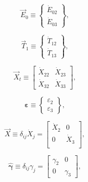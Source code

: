 \begin{equation} \label{eq:E_vec_def}
	\vec{E}_{0} 
	\equiv
	\begin{Bmatrix}
		\dot{E}_{02} \\
		\dot{E}_{03}
	\end{Bmatrix},
\end{equation} 

\begin{equation} \label{eq:T_vec_def}
	\vec{T}_{1} 
	\equiv
	\begin{Bmatrix}
		\dot{T}_{12} \\
		\dot{T}_{13}
	\end{Bmatrix},
\end{equation} 

\begin{equation} \label{eq:X_t_matrix_def}
	\vec{X}_{t} 
	\equiv
	\begin{bmatrix}
		\dot{X}_{22} & \dot{X}_{23} \\
		\dot{X}_{32} & \dot{X}_{33}
	\end{bmatrix},
\end{equation} 

\begin{equation} \label{eq:eps_vec_def}
	\bm{\varepsilon} 
	\equiv
	\begin{Bmatrix}
		\varepsilon_{2}	\\
		\varepsilon_{3}
	\end{Bmatrix},
\end{equation} 

\begin{equation} \label{eq:X_hat_matrix_def}
	\hat{\vec{X}} 
	\equiv
	\delta_{ij} \dot{X}_{j} 
	= 
	\begin{bmatrix}
		\dot{X}_{2}		&	0	  \\
		0				&	\dot{X}_{3}	\\
	\end{bmatrix},
\end{equation} 

\begin{equation} \label{eq:gamma_hat_matrix_def}
	\hat{\bm{\gamma}}
	\equiv
	\delta_{ij} \gamma_{j}
	=
	\begin{bmatrix}
		\gamma_{2} & 0         \\
		0          & \gamma_{3}
	\end{bmatrix},
\end{equation}

